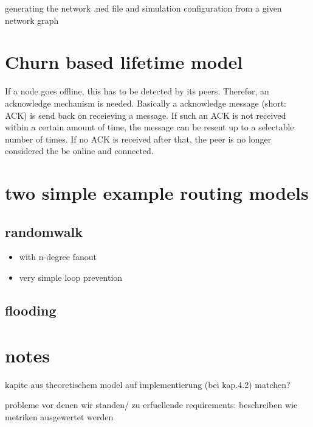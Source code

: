 generating the network .ned file and simulation configuration from a given network graph

\section{Churn based lifetime model}
If a node goes offline, this has to be detected by its peers. Therefor, an acknowledge mechanism is needed. Basically a acknowledge message (short: ACK) is send back on receieving a message. If such an ACK is not received within a certain amount of time, the message can be resent up to a selectable number of times. If no ACK is received after that, the peer is no longer considered the be online and connected.



\section{two simple example routing models}


\subsection{randomwalk}
\begin{itemize}
\item            with n-degree fanout
\item            very simple loop prevention
\end{itemize}
\subsection{flooding}

\section{notes}
kapite aus theoretischem model auf implementierung (bei kap.4.2) matchen?

probleme vor denen wir standen/ zu erfuellende requirements: beschreiben wie metriken ausgewertet werden

